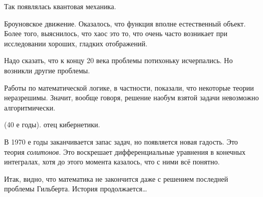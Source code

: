 \documentclass[a4paper,oneside,fleqn,10pt]{article}
\begin{document}
Так появлялась квантовая механика.

Броуновское движение. Оказалось, что функция
 вполне естественный объект.  Более
того, выяснилось, что хаос это то, что очень часто возникает при
исследовании хороших, гладких отображений.

Надо сказать, что к концу 20 века проблемы 
потихоньку исчерпались.  Но возникли другие проблемы.

Работы по математической логике, в частности, показали, что некоторые
теории неразрешимы. Значит, вообще говоря, решение наобум взятой
задачи невозможно алгоритмически.

 (40 е
годы).  отец кибернетики.

В 1970 е годы заканчивается запас задач, но появляется новая
гадость. Это теория \emph{солитонов}.  Это воскрешает дифференциальные
уравнения в конечных интегралах, хотя до этого момента казалось, что с
ними всё понятно.

Итак, видно, что математика не закончится даже с решением последней
проблемы Гильберта. История продолжается\ldots

\tbk

\newpage
\scriptsize
\end{document}

